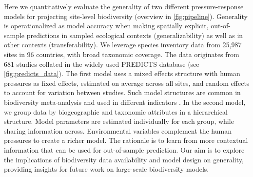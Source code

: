 Here we quantitatively evaluate the generality of two different pressure-response models for projecting site-level biodiversity (overview in \autoref{fig:pipeline}). Generality is operationalized as model accuracy when making spatially explicit, out-of-sample predictions in sampled ecological contexts (generalizability) as well as in other contexts (transferability). We leverage species inventory data from 25,987 sites in 96 countries, with broad taxonomic coverage. The data originates from 681 studies collated in the widely used PREDICTS database\cite{hudson2017} (see \autoref{fig:predicts_data}). The first model uses a mixed effects structure\cite{harrison2018} with human pressures as fixed effects, estimated on average across all sites, and random effects to account for variation between studies. Such model structures are common in biodiversity meta-analysis\cite{spake2022} and used in different indicators \cite{newbold2015,schipper2020}. In the second model, we group data by biogeographic and taxonomic attributes in a hierarchical structure. Model parameters are estimated individually for each group, while sharing information across. Environmental variables complement the human pressures to create a richer model. The rationale is to learn from more contextual information that can be used for out-of-sample prediction. Our aim is to explore the implications of biodiversity data availability and model design on generality, providing insights for future work on large-scale biodiversity models.
